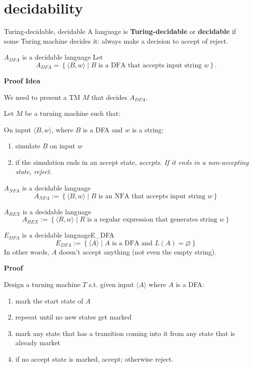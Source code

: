 \documentclass[a4paper]{article}
\begin{document}
\newpage
\section{decidability}

\begin{Definition}{Turing-decidable, decidable}{}
	A language is \textbf{Turing-decidable} or \textbf{decidable} if some Turing machine decides it: always make a decision to accept of reject.   
\end{Definition}

\begin{Theorem}{$A_{DFA}$ is a decidable language}{}
	Let \[
	A_{DFA} = \left\{ \langle B, w \rangle  \mid  B \text{ is a DFA that accepts input string } w \right\}.
	\] 
\end{Theorem}
\textbf{Proof Idea}

We need to present a TM $M$ that decides  $A_{DFA}$.

Let $M$ be a turning machine such that:

On input  $\langle B, w \rangle $, where $B$ is a DFA and  $w$ is a string:
 \begin{enumerate}
	 \item simulate $B$ on input  $w$
	\item if the simulation ends in an accept state, \it{accepts}. If it ends in a non-accepting state, \it{reject}.
\end{enumerate}


\begin{Theorem}{$A_{NFA}$ is a decidable language}{}
	\[
		A_{NFA} := \left\{ \langle B,w \rangle \mid B \text{ is an NFA that accepts input string } w  \right\} 
	\] 
\end{Theorem}

\begin{Theorem}{$A_{REX}$ is a decidable language}{}
	\[ A_{REX} := \left\{ \langle R,w \rangle \mid R \text{ is a regular expression that generates string } w  \right\} 
	\] 
\end{Theorem}

\begin{Theorem}{$E_{DFA}$ is a decidable language}{E_DFA} 
	\[
	E_{DFA} := \left\{ \langle A \rangle \mid A \text{ is a DFA and }L(A) = \varnothing  \right\} 
\] 
In other words, $A$ doesn't accept anything (not even the empty string).
\end{Theorem}

\textbf{Proof}

Design a turning machine $T$ s.t. given input  $\langle A \rangle $ where $A$ is a DFA:
 \begin{enumerate}
	 \item mark the start state of $A$
	\item repeeat until no new states get marked
	\item mark any state that has a transition coming into it from any state that is already market
	\item if no accept state is marked, accept; otherwise reject.
\end{enumerate}
\end{document}
